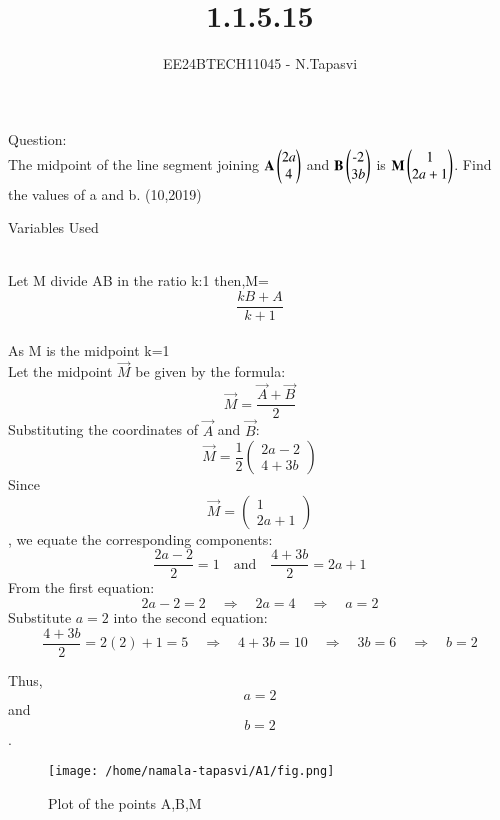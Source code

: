 \documentclass[journal]{IEEEtran}
\begin{document}

\vspace{3cm}

\title{1.1.5.15}
\author{EE24BTECH11045 - N.Tapasvi}
{\let\newpage\relax\maketitle}
Question:\\
The midpoint of the line segment joining $\mathbf{A}\begin{pmatrix}2a\\4\end{pmatrix}$ and $\mathbf{B}\begin{pmatrix}\text{-}2\\3b\end{pmatrix}$ is $\mathbf{M}\begin{pmatrix}1\\2a+1\end{pmatrix}$. Find the values of a and b.
\hfill (10,2019)

\solution
\begin{table}[h!]    
  \centering
  
  \caption{Variables Used}
  \label{tab1-1.5-15}
\end{table}\\

Let M divide AB in the ratio k:1
then,M=$$\frac{kB+A}{k+1}$$\\

As M is the midpoint k=1\\

Let the midpoint \( \vec{M} \) be given by the formula:
$$\vec{M} = \frac{\vec{A} + \vec{B}}{2}$$
Substituting the coordinates of \( \vec{A} \) and \( \vec{B} \):
$$\vec{M} = \frac{1}{2} \begin{pmatrix} 2a - 2 \\ 4 + 3b \end{pmatrix}$$
Since $$\vec{M} = \begin{pmatrix} 1 \\ 2a+1 \end{pmatrix}$$, we equate the corresponding components:
$$\frac{2a - 2}{2} = 1 \quad \text{and} \quad \frac{4 + 3b}{2} = 2a + 1$$
From the first equation:
$$2a - 2 = 2 \quad \Rightarrow \quad 2a = 4 \quad \Rightarrow \quad a = 2$$
Substitute \( a = 2 \) into the second equation:
$$\frac{4 + 3b}{2} = 2(2) + 1 = 5 \quad \Rightarrow \quad 4 + 3b = 10 \quad \Rightarrow \quad 3b = 6 \quad \Rightarrow \quad b = 2$$

Thus, $$a = 2$$ and $$b = 2$$.


\begin{figure}[h!]
   \centering
	\texttt{[image: /home/namala-tapasvi/A1/fig.png]}
   \caption{Plot of the points A,B,M}
   \label{stemplot}
\end{figure}
\end{document}
